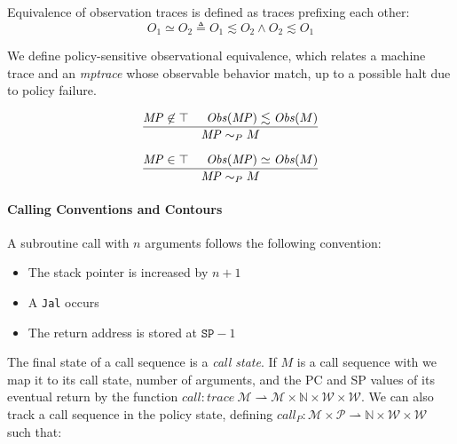 \documentclass[conference]{IEEEtran}
\newcommand{\MP}{\mathit{MP}}
\begin{document}

    Equivalence of observation traces is defined as traces prefixing each other:
    \[O_1 \simeq O_2 \triangleq O_1 \lesssim O_2 \land O_2 \lesssim O_1\]

    
    We define policy-sensitive observational equivalence, which relates a machine trace and
    an {\it mptrace} whose observable behavior match, up to a possible halt due to policy failure.

    \[\frac{\MP \not \in \top \hspace{.5cm} \mathit{Obs}(\MP) \lesssim \mathit{Obs}(M)}
           {\MP \sim_P M}\]
    
    \[\frac{\MP \in \top \hspace{.5cm} \mathit{Obs}(\MP) \simeq \mathit{Obs}(M)}
           {\MP \sim_P M}\]
    

  \paragraph{Calling Conventions and Contours}

      A subroutine call with \(n\) arguments follows the following convention:

      \begin{itemize}
        \item The stack pointer is increased by \(n+1\)
        \item A {\tt Jal} occurs
        \item The return address is stored at \(\mathtt{SP} - 1\)
      \end{itemize}


      The final state of a call sequence  is a {\it call state}. If \(M\) is a call sequence with
      we map it  to its call state, number of arguments, and the PC and SP values of its eventual
      return by the function \(\mathit{call} : \mathit{trace}\ \mathcal{M} \rightharpoonup \mathcal{M}
      \times \mathbb{N} \times \mathcal{W} \times \mathcal{W}\). We can also track a call sequence in the
      policy state, defining \(\mathit{call}_P : \mathcal{M} \times \mathcal{P} \rightharpoonup \mathbb{N}
      \times \mathcal{W} \times \mathcal{W}\) such that:
\end{document}
